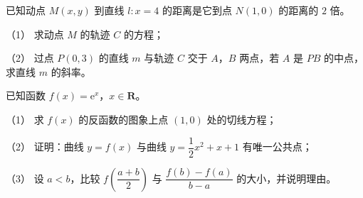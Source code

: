 \begin{question}
已知动点 $M(x,y)$ 到直线 $l:x=4$ 的距离是它到点 $N(1,0)$ 的距离的 $2$ 倍。

（1） 求动点 $M$ 的轨迹 $C$ 的方程；

（2） 过点 $P(0,3)$ 的直线 $m$ 与轨迹 $C$ 交于 $A$，$B$ 两点，若 $A$ 是 $PB$ 的中点，求直线 $m$ 的斜率。

\end{question}
\begin{question}
已知函数 $f(x)=\mathrm e^x$，$x\in\mathbf R$。

（1） 求 $f(x)$ 的反函数的图象上点 $(1,0)$ 处的切线方程；

（2） 证明：曲线 $y=f(x)$ 与曲线 $y=\dfrac12x^2+x+1$ 有唯一公共点；

（3） 设 $a<b$，比较 $f\left(\dfrac{a+b}{2}\right)$ 与 $\dfrac{f(b)-f(a)}{b-a}$ 的大小，并说明理由。

\end{question}